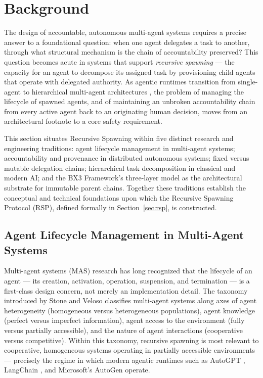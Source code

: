 \section{Background}
\label{sec:background}

The design of accountable, autonomous multi-agent systems requires a precise answer to a foundational question: when one agent delegates a task to another, through what structural mechanism is the chain of accountability preserved? This question becomes acute in systems that support \emph{recursive spawning} — the capacity for an agent to decompose its assigned task by provisioning child agents that operate with delegated authority. As agentic runtimes transition from single-agent to hierarchical multi-agent architectures \cite{wooldridge1995,stone2000}, the problem of managing the lifecycle of spawned agents, and of maintaining an unbroken accountability chain from every active agent back to an originating human decision, moves from an architectural footnote to a core safety requirement.

This section situates Recursive Spawning within five distinct research and engineering traditions: agent lifecycle management in multi-agent systems; accountability and provenance in distributed autonomous systems; fixed versus mutable delegation chains; hierarchical task decomposition in classical and modern AI; and the BX3 Framework's three-layer model as the architectural substrate for immutable parent chains. Together these traditions establish the conceptual and technical foundations upon which the Recursive Spawning Protocol (RSP), defined formally in Section~\ref{sec:rsp}, is constructed.

\subsection{Agent Lifecycle Management in Multi-Agent Systems}

Multi-agent systems (MAS) research has long recognized that the lifecycle of an agent — its creation, activation, operation, suspension, and termination — is a first-class design concern, not merely an implementation detail. The taxonomy introduced by Stone and Veloso \cite{stone2000} classifies multi-agent systems along axes of agent heterogeneity (homogeneous versus heterogeneous populations), agent knowledge (perfect versus imperfect information), agent access to the environment (fully versus partially accessible), and the nature of agent interactions (cooperative versus competitive). Within this taxonomy, recursive spawning is most relevant to cooperative, homogeneous systems operating in partially accessible environments — precisely the regime in which modern agentic runtimes such as AutoGPT \cite{autogpt2023}, LangChain \cite{langchain2023}, and Microsoft's AutoGen \cite{autogen2023} operate.

